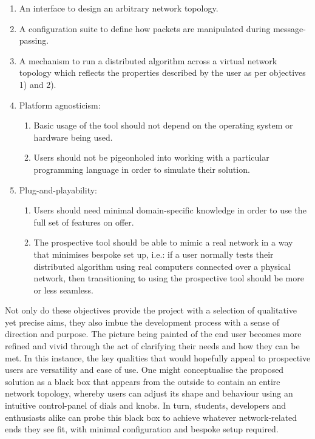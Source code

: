 \begin{enumerate}
    \item An interface to design an arbitrary network topology.
    \item A configuration suite to define how packets are manipulated during message-passing.
    \item A mechanism to run a distributed algorithm across a virtual network topology which reflects the properties
    described by the user as per objectives 1) and 2).
    \item Platform agnosticism:
    \begin{enumerate}
        \item Basic usage of the tool should not depend on the operating system or hardware being used.
        \item Users should not be pigeonholed into working with a particular programming language in order to
        simulate their solution.
    \end{enumerate}
    \item Plug-and-playability:
    \begin{enumerate}
        \item Users should need minimal domain-specific knowledge in order to use the full set of features on offer.
        \item The prospective tool should be able to mimic a real network in a way that minimises bespoke set up,
        i.e.: if a user normally tests their distributed algorithm using real computers connected over a physical
        network, then transitioning to using the prospective tool should be more or less seamless.
    \end{enumerate}
\end{enumerate}

Not only do these objectives provide the project with a selection of qualitative yet precise aims, they also imbue
the development process with a sense of direction and purpose. The picture being painted of the end user becomes more
refined and vivid through the act of clarifying their needs and how they can be met. In this instance, the key
qualities that would hopefully appeal to prospective users are versatility and ease of use. One might conceptualise
the proposed solution as a black box that appears from the outside to contain an entire network topology, whereby
users can adjust its shape and behaviour using an intuitive control-panel of dials and knobs. In turn, students,
developers and enthusiasts alike can probe this black box to achieve whatever network-related ends they see fit, with
minimal configuration and bespoke setup required.


